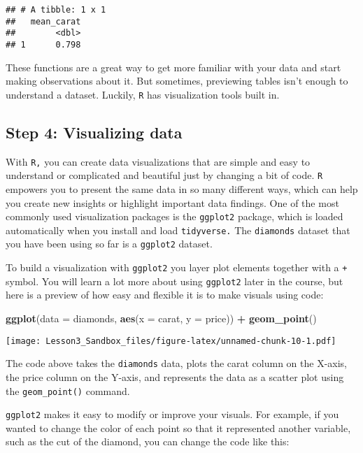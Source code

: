 \documentclass[
]{article}
\newenvironment{Shaded}{\begin{snugshade}}{\end{snugshade}}
\newcommand{\AttributeTok}[1]{\textcolor[rgb]{0.13,0.29,0.53}{#1}}
\newcommand{\FunctionTok}[1]{\textcolor[rgb]{0.13,0.29,0.53}{\textbf{#1}}}
\newcommand{\NormalTok}[1]{#1}
\newcommand{\SpecialCharTok}[1]{\textcolor[rgb]{0.81,0.36,0.00}{\textbf{#1}}}
\begin{document}
\begin{verbatim}
## # A tibble: 1 x 1
##   mean_carat
##        <dbl>
## 1      0.798
\end{verbatim}

These functions are a great way to get more familiar with your data and
start making observations about it. But sometimes, previewing tables
isn't enough to understand a dataset. Luckily, \texttt{R} has
visualization tools built in.

\hypertarget{step-4-visualizing-data}{%
\subsection{Step 4: Visualizing data}\label{step-4-visualizing-data}}

With \texttt{R,} you can create data visualizations that are simple and
easy to understand or complicated and beautiful just by changing a bit
of code. \texttt{R} empowers you to present the same data in so many
different ways, which can help you create new insights or highlight
important data findings. One of the most commonly used visualization
packages is the \texttt{ggplot2} package, which is loaded automatically
when you install and load \texttt{tidyverse.} The \texttt{diamonds}
dataset that you have been using so far is a \texttt{ggplot2} dataset.

To build a visualization with \texttt{ggplot2} you layer plot elements
together with a \texttt{+} symbol. You will learn a lot more about using
\texttt{ggplot2} later in the course, but here is a preview of how easy
and flexible it is to make visuals using code:

\begin{Shaded}
\begin{Highlighting}[]
\FunctionTok{ggplot}\NormalTok{(}\AttributeTok{data =}\NormalTok{ diamonds, }\FunctionTok{aes}\NormalTok{(}\AttributeTok{x =}\NormalTok{ carat, }\AttributeTok{y =}\NormalTok{ price)) }\SpecialCharTok{+}
  \FunctionTok{geom\_point}\NormalTok{()}
\end{Highlighting}
\end{Shaded}

\texttt{[image: Lesson3\_Sandbox\_files/figure-latex/unnamed-chunk-10-1.pdf]}

The code above takes the \texttt{diamonds} data, plots the carat column
on the X-axis, the price column on the Y-axis, and represents the data
as a scatter plot using the \texttt{geom\_point()} command.

\texttt{ggplot2} makes it easy to modify or improve your visuals. For
example, if you wanted to change the color of each point so that it
represented another variable, such as the cut of the diamond, you can
change the code like this:
\end{document}
